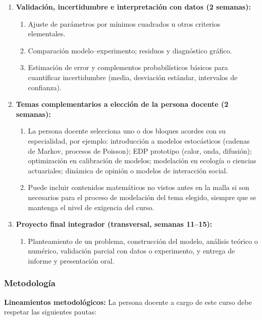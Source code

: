 \begin{refsection}
\begin{enumerate}
\begin{enumerate}
\end{enumerate}

\item \textbf{Validación, incertidumbre e interpretación con datos (2 semanas):}
\begin{enumerate}
    \item Ajuste de parámetros por mínimos cuadrados u otros criterios elementales.
    \item Comparación modelo--experimento; residuos y diagnóstico gráfico.
    \item  Estimación de error y complementos probabilísticos básicos para cuantificar incertidumbre (media, desviación estándar, intervalos de confianza).
\end{enumerate}

\item \textbf{Temas complementarios a elección de la persona docente (2 semanas):}
\begin{enumerate}
    \item La persona docente selecciona uno o dos bloques acordes con su especialidad, por ejemplo: introducción a modelos estocásticos (cadenas de Markov, procesos de Poisson); EDP prototipo (calor, onda, difusión); optimización en calibración de modelos; modelación en ecología o ciencias actuariales; dinámica de opinión o modelos de interacción social.
    \item Puede incluir contenidos matemáticos no vistos antes en la malla si son necesarios para el proceso de modelación del tema elegido, siempre que se mantenga el nivel de exigencia del curso.
\end{enumerate}

\item \textbf{Proyecto final integrador (transversal, semanas 11--15):}
\begin{enumerate}
    \item Planteamiento de un problema, construcción del modelo, análisis teórico o numérico, validación parcial con datos o experimento, y entrega de informe y presentación oral.
\end{enumerate}

\end{enumerate}

\subsubsection*{Metodología}

\noindent \textbf{Lineamientos metodológicos:} La persona docente a cargo de este curso debe respetar las siguientes pautas:


\end{refsection}
